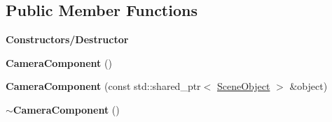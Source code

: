 \subsection*{Public Member Functions}
\begin{Indent}\textbf{ Constructors/\+Destructor}\par
\begin{DoxyCompactItemize}
\item 
\mbox{\label{classrev_1_1_camera_component_aa303631b7fb2af3b61a0f29a6f3ac2fa}} 
{\bfseries Camera\+Component} ()
\item 
\mbox{\label{classrev_1_1_camera_component_accd6718f6bc02f486ae92bdc83e8e3a6}} 
{\bfseries Camera\+Component} (const std\+::shared\+\_\+ptr$<$ \mbox{\hyperlink{classrev_1_1_scene_object}{Scene\+Object}} $>$ \&object)
\item 
\mbox{\label{classrev_1_1_camera_component_a245e8b9d46b7de70ae51557bbd66af3c}} 
{\bfseries $\sim$\+Camera\+Component} ()
\end{DoxyCompactItemize}
\end{Indent}
